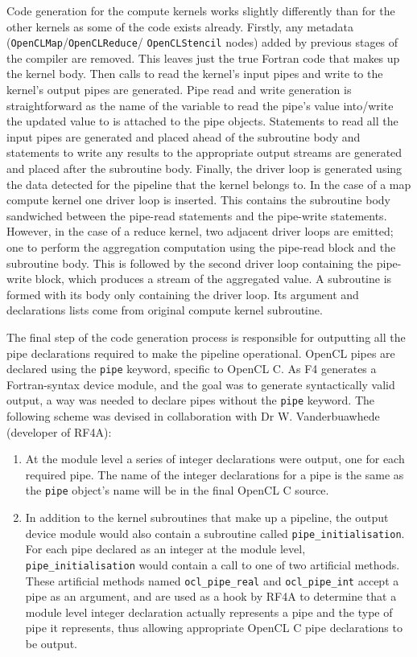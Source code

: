 \documentclass{mpaper}
\begin{document}
Code generation for the compute kernels works slightly differently than for the other kernels as some of the code exists already.
Firstly, any metadata (\texttt{OpenCLMap}/\texttt{OpenCLReduce}/ \texttt{OpenCLStencil} nodes) added by previous stages of the compiler are removed.
This leaves just the true Fortran code that makes up the kernel body.
Then calls to read the kernel's input pipes and write to the kernel's output pipes are generated.
Pipe read and write generation is straightforward as the name of the variable to read the pipe's value into/write the updated value to is attached to the pipe objects. 
Statements to read all the input pipes are generated and placed ahead of the subroutine body and statements to write any results to the appropriate output streams are generated and placed after the subroutine body.
Finally, the driver loop is generated using the data detected for the pipeline that the kernel belongs to. 
In the case of a map compute kernel one driver loop is inserted.
This contains the subroutine body sandwiched between the pipe-read statements and the pipe-write statements. 
However, in the case of a reduce kernel, two adjacent driver loops are emitted; one to perform the aggregation computation using the pipe-read block and the subroutine body.
This is followed by the second driver loop containing the pipe-write block, which produces a stream of the aggregated value.   
A subroutine is formed with its body only containing the driver loop. Its argument and declarations lists come from original compute kernel subroutine. 

The final step of the code generation process is responsible for outputting all the pipe declarations required to make the pipeline operational.
OpenCL pipes are declared using the \texttt{pipe} keyword, specific to OpenCL C.
As F4 generates a Fortran-syntax device module, and the goal was to generate syntactically valid output, a way was needed to declare pipes without the \texttt{pipe} keyword.
The following scheme was devised in collaboration with Dr W. Vanderbuawhede (developer of RF4A):

\begin{enumerate}
    \item At the module level a series of integer declarations were output, one for each required pipe. The name of the integer declarations for a pipe is the same as the \texttt{pipe} object's name will be in the final OpenCL C source.
    \item In addition to the kernel subroutines that make up a pipeline, the output device module would also contain a subroutine called \texttt{pipe\_initialisation}. For each pipe declared as an integer at the module level, \texttt{pipe\_initialisation} would contain a call to one of two artificial methods. These artificial methods named \texttt{ocl\_pipe\_real} and \texttt{ocl\_pipe\_int} accept a pipe as an argument, and are used as a hook by RF4A to determine that a module level integer declaration actually represents a pipe and the type of pipe it represents, thus allowing appropriate OpenCL C pipe declarations to be output. 
\end{enumerate}
\end{document}
